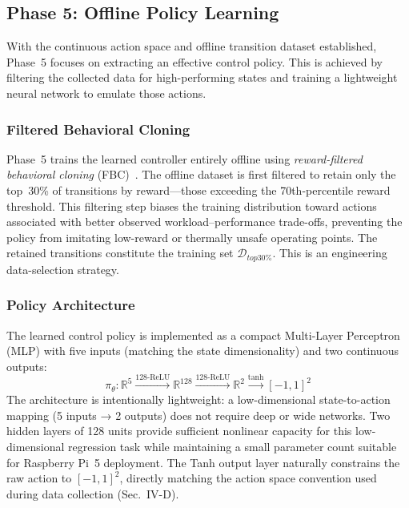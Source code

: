 \documentclass{ieeeaccess}
\begin{document}
\subsection{Phase 5: Offline Policy Learning}

With the continuous action space and offline transition dataset established, Phase~5 focuses on extracting an effective control policy. This is achieved by filtering the collected data for high-performing states and training a lightweight neural network to emulate those actions.

\subsubsection*{Filtered Behavioral Cloning}

Phase~5 trains the learned controller entirely offline using
\emph{reward-filtered behavioral cloning} (FBC)~\cite{b16}. The offline
dataset is first filtered to retain only the top~30\% of transitions by
reward---those exceeding the 70th-percentile reward threshold. This
filtering step biases the training distribution toward actions associated
with better observed workload–performance trade-offs, preventing the policy
from imitating low-reward or thermally unsafe operating points. The
retained transitions constitute the training set $\mathcal{D}_{top30\%}$.
This is an engineering data-selection strategy.

\subsubsection*{Policy Architecture}

The learned control policy is implemented as a compact Multi-Layer Perceptron (MLP) with five inputs (matching
the state dimensionality) and two continuous outputs:
\begin{equation}
\pi_\theta : \mathbb{R}^5 \xrightarrow{128\text{-ReLU}} \mathbb{R}^{128}
\xrightarrow{128\text{-ReLU}} \mathbb{R}^2 \xrightarrow{\tanh} [-1,1]^2
\end{equation}
The architecture is intentionally lightweight: a low-dimensional
state-to-action mapping (5 inputs → 2 outputs) does not require deep or
wide networks. Two hidden layers of 128 units provide sufficient nonlinear
capacity for this low-dimensional regression task while maintaining a small
parameter count suitable for Raspberry Pi~5 deployment. The Tanh output
layer naturally constrains the raw action to $[-1,1]^2$, directly matching
the action space convention used during data collection (Sec.~IV-D).
\end{document}
